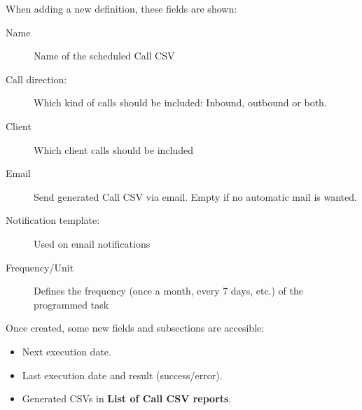 \documentclass[letterpaper,10pt,english]{sphinxmanual}
\begin{document}
When adding a new definition, these fields are shown:
\begin{description}
\item[{Name}] \leavevmode{}\label{administration_portal/client/residential/calls/call_csv_schedulers:term-name}
Name of the scheduled Call CSV

\item[{Call direction:}] \leavevmode{}\label{administration_portal/client/residential/calls/call_csv_schedulers:term-call-direction}
Which kind of calls should be included: Inbound, outbound or both.

\item[{Client}] \leavevmode{}\label{administration_portal/client/residential/calls/call_csv_schedulers:term-client}
Which client calls should be included

\item[{Email}] \leavevmode{}\label{administration_portal/client/residential/calls/call_csv_schedulers:term-email}
Send generated Call CSV via email. Empty if no automatic mail is wanted.

\item[{Notification template:}] \leavevmode{}\label{administration_portal/client/residential/calls/call_csv_schedulers:term-notification-template}
Used on email notifications

\item[{Frequency/Unit}] \leavevmode{}\label{administration_portal/client/residential/calls/call_csv_schedulers:term-frequency-unit}
Defines the frequency (once a month, every 7 days, etc.) of the programmed task

\end{description}

Once created, some new fields and subsections are accesible:
\begin{itemize}
\item {} 
Next execution date.

\item {} 
Last execution date and result (success/error).

\item {} 
Generated CSVs in \textbf{List of Call CSV reports}.

\end{itemize}
\end{document}
